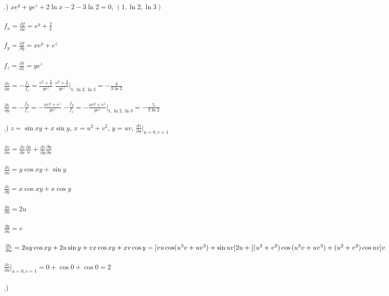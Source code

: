 \documentclass[12pt]{article}
\begin{document}
.) $xe^{y} + ye^{z} + 2\ln{x}-2 -3\ln{2} = 0$, \hspace{10pt} $(1, \ln{2}, \ln{3})$\\\\
\noindent $f_{x} = \frac{\partial f}{\partial x} = e^{y}+\frac{2}{x}$\\\\
\noindent $f_{y} = \frac{\partial f}{\partial y} = xe^{y}+e^{z}$\\\\
\noindent $f_{z} = \frac{\partial f}{\partial z} = ye^{z}$\\\\
\noindent $\frac{\partial z}{\partial x} = -\frac{f_{x}}{f_{z}} = \frac{e^{y}+\frac{2}{x}}{ye^{z}}$
\noindent $\frac{e^{y}+\frac{2}{x}}{ye^{z}}\Big|_{1, \ln{2}, \ln{3}} = -\frac{4}{3\ln{2}}$\\\\
\noindent $\frac{\partial z}{\partial y} = -\frac{f_{y}}{f_{z}} = -\frac{xe^{y}+e^{z}}{ye^{z}}$
\noindent $-\frac{f_{y}}{f_{z}} = -\frac{xe^{y}+e^{z}}{ye^{z}}\Big|_{1, \ln{2}, \ln{3}} = -\frac{5}{3\ln{2}}$\\\\

.)  \hspace{10pt}$z = \sin{xy} + x\sin{y}$, \hspace{10pt} $x = u^{2} + v^{2}$, \hspace{10pt} $y = uv$, \hspace{10pt} $\frac{\partial z}{\partial u} \Big|_{u = 0, v=1}$\\\\
\noindent $\frac{\partial z}{\partial u} = \frac{\partial z}{\partial x}\frac{\partial x}{u} + \frac{\partial z}{\partial y}\frac{\partial y}{\partial u}$\\\\
\noindent $\frac{\partial z}{\partial x} = y\cos{xy} + \sin{y}$\\\\
\noindent $\frac{\partial z}{\partial y} = x\cos{xy} + x\cos{y}$\\\\
\noindent $\frac{\partial x}{\partial u} = 2u$\\\\
\noindent $\frac{\partial y}{\partial u} = v$\\\\

\noindent $\frac{\partial z}{\partial u} = 2uy\cos{xy} + 2u\sin{y} + vx\cos{xy} + xv\cos{y}
\\\\= [vu\cos(u^{3}v + uv^{3}) + \sin{uv}]2u + [(u^{2}+v^{2})\cos{(u^{3}v + uv^{3}) + (u^{2} + v^{2})\cos{uv}}]v$\\\\


\noindent $\frac{\partial z}{\partial u} \Big|_{u = 0, v=1} = 0+\cos{0} + \cos{0} = 2$\\\\



.) 
\end{document}
